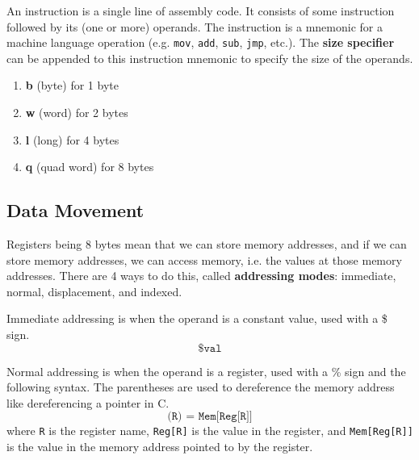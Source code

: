   \begin{definition}[Instruction]
    An instruction is a single line of assembly code. It consists of some instruction followed by its (one or more) operands. The instruction is a mnemonic for a machine language operation (e.g. \texttt{mov}, \texttt{add}, \texttt{sub}, \texttt{jmp}, etc.). The \textbf{size specifier} can be appended to this instruction mnemonic to specify the size of the operands. 
    \begin{enumerate} 
      \item \textbf{b} (byte) for 1 byte 
      \item \textbf{w} (word) for 2 bytes
      \item \textbf{l} (long) for 4 bytes 
      \item \textbf{q} (quad word) for 8 bytes
    \end{enumerate}
  \end{definition}

\subsection{Data Movement}

  Registers being 8 bytes mean that we can store memory addresses, and if we can store memory addresses, we can access memory, i.e. the values at those memory addresses. There are 4 ways to do this, called \textbf{addressing modes}: immediate, normal, displacement, and indexed. 

  \begin{definition}
    Immediate addressing is when the operand is a constant value, used with a \$ sign. 
    \begin{equation}
      \texttt{\$val}
    \end{equation}
  \end{definition}

  \begin{definition}
    Normal addressing is when the operand is a register, used with a \% sign and the following syntax. The parentheses are used to dereference the memory address like dereferencing a pointer in C. 
    \begin{equation}
      \texttt{(R) = Mem[Reg[R]]}
    \end{equation}
    where \texttt{R} is the register name, \texttt{Reg[R]} is the value in the register, and \texttt{Mem[Reg[R]]} is the value in the memory address pointed to by the register. 
  \end{definition}

